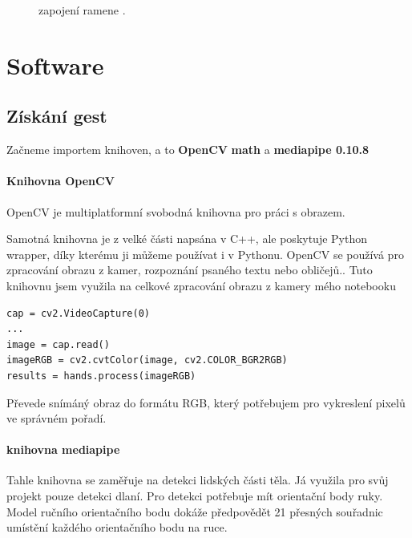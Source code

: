 \documentclass[12pt, a4paper,
twoside,        %
openright
]{report}
\begin{document}
{\begin{figure}[h]
	
	\caption{zapojení ramene  \cite{obvod}.} %
	\label{fig:obvod} %
\end{figure}

\newpage




\chapter{Software}

\section{Získání gest}
Začneme importem knihoven, a to \textbf{OpenCV}  \textbf{math} a \textbf{mediapipe 0.10.8}  

\subsubsection{Knihovna OpenCV}
OpenCV je multiplatformní svobodná knihovna pro práci s obrazem.

 Samotná knihovna je z velké části napsána v C++, ale poskytuje Python wrapper, díky kterému ji můžeme používat i v Pythonu. 
 OpenCV se používá pro zpracování obrazu z kamer, rozpoznání psaného textu nebo obličejů..
Tuto knihovnu jsem využila na celkové zpracování obrazu z kamery mého notebooku


\begin{lstlisting}[style=Python, caption={obraz, a jeho převedení do správného formátu}]
cap = cv2.VideoCapture(0)
...
image = cap.read()
imageRGB = cv2.cvtColor(image, cv2.COLOR_BGR2RGB)
results = hands.process(imageRGB)
\end{lstlisting}

Převede snímáný obraz do formátu RGB, který potřebujem pro vykreslení pixelů ve správném pořadí.

\subsubsection{knihovna mediapipe}

Tahle knihovna se zaměřuje na detekci lidských části těla.
Já využila pro svůj projekt pouze detekci dlaní.
Pro detekci potřebuje mít orientační body ruky. Model ručního orientačního bodu dokáže předpovědět 21 přesných souřadnic umístění každého orientačního bodu na ruce.

\begin{figure}[h]
	

\end{figure}}
\end{document}

